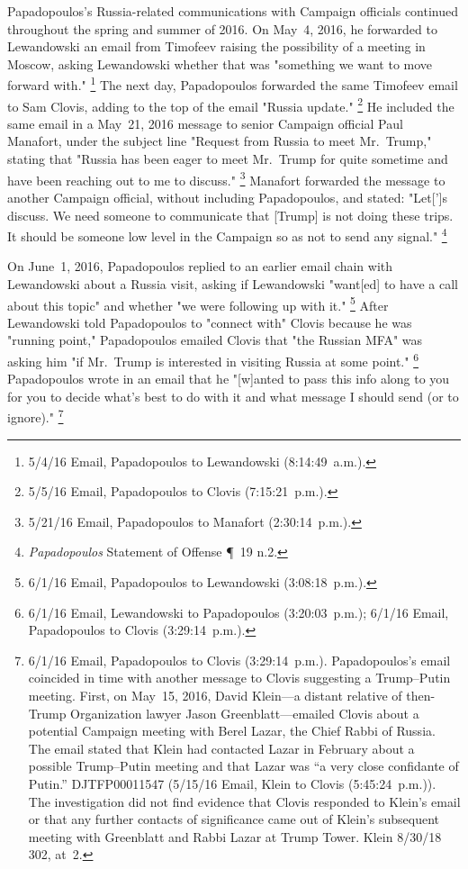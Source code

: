 Papadopoulos's Russia-related communications with Campaign officials continued throughout the spring and summer of 2016.
On May~4, 2016, he forwarded to Lewandowski an email from Timofeev raising the possibility of a meeting in Moscow, asking Lewandowski whether that was "something we want to move forward with."%
\footnote{5/4/16 Email, Papadopoulos to Lewandowski (8:14:49~a.m.).}
The next day, Papadopoulos forwarded the same Timofeev email to Sam Clovis, adding to the top of the email "Russia update."%
\footnote{5/5/16 Email, Papadopoulos to Clovis (7:15:21~p.m.).}
He included the same email in a May~21, 2016 message to senior Campaign official Paul Manafort, under the subject line "Request from Russia to meet Mr.~Trump," stating that "Russia has been eager to meet Mr.~Trump for quite sometime and have been reaching out to me to discuss."%
\footnote{5/21/16 Email, Papadopoulos to Manafort (2:30:14~p.m.).}
Manafort forwarded the message to another Campaign official, without including Papadopoulos, and stated: "Let[']s discuss.
We need someone to communicate that [Trump] is not doing these trips.
It should be someone low level in the Campaign so as not to send any signal."%
\footnote{\textit{Papadopoulos} Statement of Offense \P~19 n.2.}

On June~1, 2016, Papadopoulos replied to an earlier email chain with Lewandowski about a Russia visit, asking if Lewandowski "want[ed] to have a call about this topic" and whether "we were following up with it."%
\footnote{6/1/16 Email, Papadopoulos to Lewandowski (3:08:18~p.m.).}
After Lewandowski told Papadopoulos to "connect with" Clovis because he was "running point," Papadopoulos emailed Clovis that "the Russian MFA" was asking him "if Mr.~Trump is interested in visiting Russia at some point."%
\footnote{6/1/16 Email, Lewandowski to Papadopoulos (3:20:03~p.m.);
6/1/16 Email, Papadopoulos to Clovis (3:29:14~p.m.).}
Papadopoulos wrote in an email that he "[w]anted to pass this info along to you for you to decide what's best to do with it and what message I should send (or to ignore)."%
\footnote{6/1/16 Email, Papadopoulos to Clovis (3:29:14~p.m.).
Papadopoulos's email coincided in time with another message to Clovis suggesting a Trump--Putin meeting.
First, on May~15, 2016, David Klein---a distant relative of then-Trump Organization lawyer Jason Greenblatt---emailed Clovis about a potential Campaign meeting with Berel Lazar, the Chief Rabbi of Russia.
The email stated that Klein had contacted Lazar in February about a possible Trump--Putin meeting and that Lazar was ``a very close confidante of Putin.''
DJTFP00011547 (5/15/16 Email, Klein to Clovis (5:45:24~p.m.)).
The investigation did not find evidence that Clovis responded to Klein's email or that any further contacts of significance came out of Klein's subsequent meeting with Greenblatt and Rabbi Lazar at Trump Tower.
Klein 8/30/18 302, at~2.}

